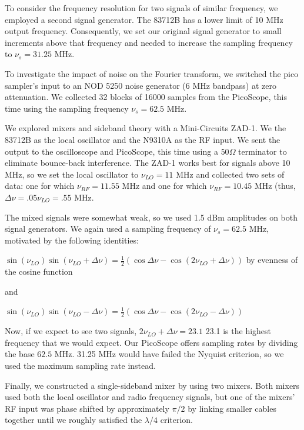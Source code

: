 \documentclass[a4paper]{article}
\begin{document}
To consider the frequency resolution for two signals of similar frequency, we employed a second signal generator. The 83712B has a lower limit of 10 MHz output frequency. Consequently, we set our original signal generator to small increments above that frequency and needed to increase the sampling frequency to $\nu_s = 31.25$ MHz.

To investigate the impact of noise on the Fourier transform, we switched the pico sampler's input to an NOD 5250 noise generator (6 MHz bandpass) at zero attenuation. We collected 32 blocks of 16000 samples from the PicoScope, this time using the sampling frequency $\nu_s = 62.5$ MHz.

We explored mixers and sideband theory with a Mini-Circuits ZAD-1. We the 83712B as the local oscillator and the N9310A as the RF input. We sent the output to the oscilloscope and PicoScope, this time using a $50 \Omega$ terminator to eliminate bounce-back interference. The ZAD-1 works best for signals above 10 MHz, so we set the local oscillator to $\nu_{LO} = 11$ MHz and collected two sets of data: one for which $\nu_{RF} = 11.55$ MHz and one for which $\nu_{RF}=10.45$ MHz (thus, $\Delta \nu = .05 \nu_{LO} = .55$ MHz. 

The mixed signals were somewhat weak, so we used 1.5 dBm amplitudes on both signal generators. We again used a sampling frequency of $\nu_s = 62.5$ MHz, motivated by the following identities:

$\sin(\nu_{LO}) \sin(\nu_{LO} + \Delta \nu) = \frac{1}{2} (\cos \Delta \nu - \cos (2\nu_{LO} + \Delta \nu))$ by evenness of the cosine function

and

$\sin(\nu_{LO}) \sin(\nu_{LO} - \Delta \nu) = \frac{1}{2} (\cos \Delta \nu - \cos (2\nu_{LO} - \Delta \nu))$

Now, if we expect to see two signals, $2\nu_{LO} + \Delta \nu = 23.1$ 23.1 is the highest frequency that we would expect. Our PicoScope offers sampling rates by dividing the base $62.5$ MHz. 31.25 MHz would have failed the Nyquist criterion, so we used the maximum sampling rate instead. 

Finally, we constructed a single-sideband mixer by using two mixers. Both mixers used both the local oscillator and radio frequency signals, but one of the mixers' RF input was phase shifted by approximately $\pi / 2$ by linking smaller cables together until we roughly satisfied the $\lambda / 4$ criterion.

\end{document}
